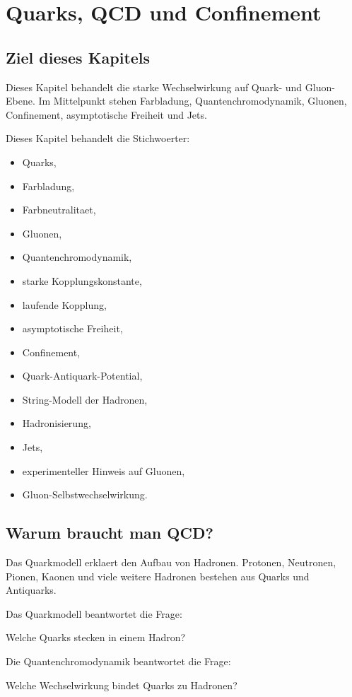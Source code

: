 \chapter{Quarks, QCD und Confinement}

\section{Ziel dieses Kapitels}

Dieses Kapitel behandelt die starke Wechselwirkung auf Quark- und Gluon-Ebene.
Im Mittelpunkt stehen Farbladung, Quantenchromodynamik, Gluonen,
Confinement, asymptotische Freiheit und Jets.

\begin{notebox}
Dieses Kapitel behandelt die Stichwoerter:
\begin{itemize}
    \item Quarks,
    \item Farbladung,
    \item Farbneutralitaet,
    \item Gluonen,
    \item Quantenchromodynamik,
    \item starke Kopplungskonstante,
    \item laufende Kopplung,
    \item asymptotische Freiheit,
    \item Confinement,
    \item Quark-Antiquark-Potential,
    \item String-Modell der Hadronen,
    \item Hadronisierung,
    \item Jets,
    \item experimenteller Hinweis auf Gluonen,
    \item Gluon-Selbstwechselwirkung.
\end{itemize}
\end{notebox}

\section{Warum braucht man QCD?}

Das Quarkmodell erklaert den Aufbau von Hadronen.
Protonen, Neutronen, Pionen, Kaonen und viele weitere Hadronen bestehen aus Quarks
und Antiquarks.

\begin{conceptbox}
Das Quarkmodell beantwortet die Frage:
\begin{center}
Welche Quarks stecken in einem Hadron?
\end{center}

Die Quantenchromodynamik beantwortet die Frage:
\begin{center}
Welche Wechselwirkung bindet Quarks zu Hadronen?
\end{center}
\end{conceptbox}

